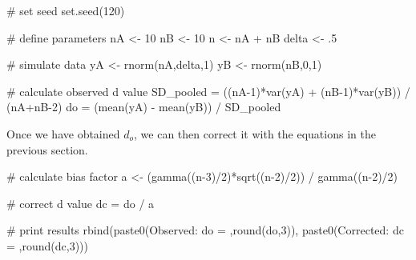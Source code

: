 \documentclass[
  letterpaper,
  DIV=11,
  numbers=noendperiod]{scrreprt}
\newenvironment{Shaded}{\begin{snugshade}}{\end{snugshade}}
\newcommand{\CommentTok}[1]{\textcolor[rgb]{0.37,0.37,0.37}{#1}}
\newcommand{\DecValTok}[1]{\textcolor[rgb]{0.68,0.00,0.00}{#1}}
\newcommand{\FunctionTok}[1]{\textcolor[rgb]{0.28,0.35,0.67}{#1}}
\newcommand{\NormalTok}[1]{\textcolor[rgb]{0.00,0.23,0.31}{#1}}
\newcommand{\OtherTok}[1]{\textcolor[rgb]{0.00,0.23,0.31}{#1}}
\newcommand{\SpecialCharTok}[1]{\textcolor[rgb]{0.37,0.37,0.37}{#1}}
\newcommand{\StringTok}[1]{\textcolor[rgb]{0.13,0.47,0.30}{#1}}
\begin{document}
\begin{Shaded}
\begin{Highlighting}[]
\CommentTok{\# set seed}
\FunctionTok{set.seed}\NormalTok{(}\DecValTok{120}\NormalTok{)}

\CommentTok{\# define parameters}
\NormalTok{nA }\OtherTok{\textless{}{-}} \DecValTok{10}
\NormalTok{nB }\OtherTok{\textless{}{-}} \DecValTok{10}
\NormalTok{n }\OtherTok{\textless{}{-}}\NormalTok{ nA }\SpecialCharTok{+}\NormalTok{ nB}
\NormalTok{delta }\OtherTok{\textless{}{-}}\NormalTok{ .}\DecValTok{5}

\CommentTok{\# simulate data}
\NormalTok{yA }\OtherTok{\textless{}{-}} \FunctionTok{rnorm}\NormalTok{(nA,delta,}\DecValTok{1}\NormalTok{)}
\NormalTok{yB }\OtherTok{\textless{}{-}} \FunctionTok{rnorm}\NormalTok{(nB,}\DecValTok{0}\NormalTok{,}\DecValTok{1}\NormalTok{)}

\CommentTok{\# calculate observed d value}
\NormalTok{SD\_pooled }\OtherTok{=}\NormalTok{ ((nA}\DecValTok{{-}1}\NormalTok{)}\SpecialCharTok{*}\FunctionTok{var}\NormalTok{(yA) }\SpecialCharTok{+}\NormalTok{ (nB}\DecValTok{{-}1}\NormalTok{)}\SpecialCharTok{*}\FunctionTok{var}\NormalTok{(yB)) }\SpecialCharTok{/}\NormalTok{ (nA}\SpecialCharTok{+}\NormalTok{nB}\DecValTok{{-}2}\NormalTok{)}
\NormalTok{do }\OtherTok{=}\NormalTok{ (}\FunctionTok{mean}\NormalTok{(yA) }\SpecialCharTok{{-}} \FunctionTok{mean}\NormalTok{(yB)) }\SpecialCharTok{/}\NormalTok{ SD\_pooled}
\end{Highlighting}
\end{Shaded}

Once we have obtained \(d_o\), we can then correct it with the equations
in the previous section.

\begin{Shaded}
\begin{Highlighting}[]
\CommentTok{\# calculate bias factor}
\NormalTok{a }\OtherTok{\textless{}{-}}\NormalTok{ (}\FunctionTok{gamma}\NormalTok{((n}\DecValTok{{-}3}\NormalTok{)}\SpecialCharTok{/}\DecValTok{2}\NormalTok{)}\SpecialCharTok{*}\FunctionTok{sqrt}\NormalTok{((n}\DecValTok{{-}2}\NormalTok{)}\SpecialCharTok{/}\DecValTok{2}\NormalTok{)) }\SpecialCharTok{/} \FunctionTok{gamma}\NormalTok{((n}\DecValTok{{-}2}\NormalTok{)}\SpecialCharTok{/}\DecValTok{2}\NormalTok{) }

\CommentTok{\# correct d value}
\NormalTok{dc }\OtherTok{=}\NormalTok{ do }\SpecialCharTok{/}\NormalTok{ a}

\CommentTok{\# print results}
\FunctionTok{rbind}\NormalTok{(}\FunctionTok{paste0}\NormalTok{(}\StringTok{\textquotesingle{}Observed: do = \textquotesingle{}}\NormalTok{,}\FunctionTok{round}\NormalTok{(do,}\DecValTok{3}\NormalTok{)),}
      \FunctionTok{paste0}\NormalTok{(}\StringTok{\textquotesingle{}Corrected: dc = \textquotesingle{}}\NormalTok{,}\FunctionTok{round}\NormalTok{(dc,}\DecValTok{3}\NormalTok{)))}
\end{Highlighting}
\end{Shaded}
\end{document}
